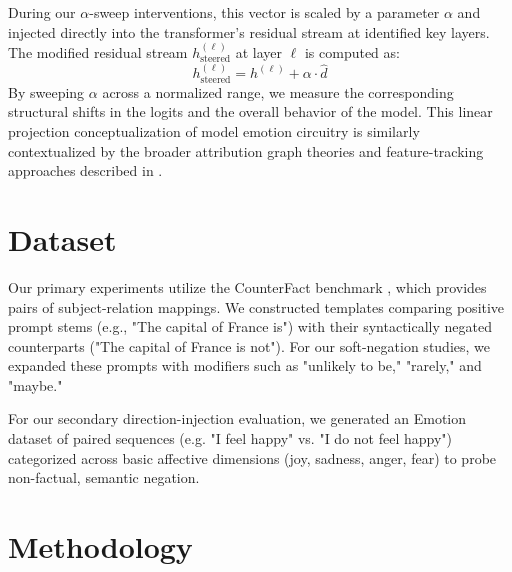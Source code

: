 \documentclass[11pt]{article}
\begin{document}
During our $\alpha$-sweep interventions, this vector is scaled by a parameter $\alpha$ and injected directly into the transformer's residual stream at identified key layers. The modified residual stream $h^{(\ell)}_{\text{steered}}$ at layer $\ell$ is computed as:
\begin{equation}
h^{(\ell)}_{\text{steered}} = h^{(\ell)} + \alpha \cdot \hat{d}
\end{equation}
By sweeping $\alpha$ across a normalized range, we measure the corresponding structural shifts in the logits and the overall behavior of the model. This linear projection conceptualization of model emotion circuitry is similarly contextualized by the broader attribution graph theories and feature-tracking approaches described in \citet{biology2025}.

\section{Dataset}
\label{sec:data}
Our primary experiments utilize the CounterFact benchmark \citep{meng2022}, which provides pairs of subject-relation mappings. We constructed templates comparing positive prompt stems (e.g., "The capital of France is") with their syntactically negated counterparts ("The capital of France is not"). For our soft-negation studies, we expanded these prompts with modifiers such as "unlikely to be," "rarely," and "maybe."

For our secondary direction-injection evaluation, we generated an Emotion dataset of paired sequences (e.g. "I feel happy" vs. "I do not feel happy") categorized across basic affective dimensions (joy, sadness, anger, fear) to probe non-factual, semantic negation.

\section{Methodology}
\label{sec:method}
\end{document}
